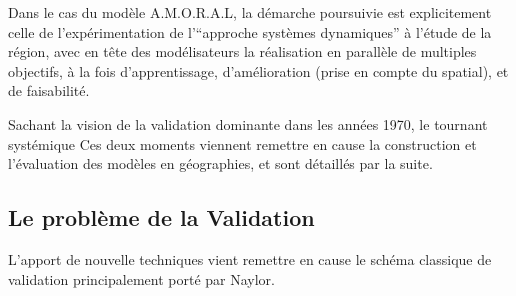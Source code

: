 Dans le cas du modèle A.M.O.R.A.L, la démarche poursuivie est explicitement celle de l'expérimentation de l'\enquote{approche systèmes dynamiques} à l'étude de la région, avec en tête des modélisateurs la réalisation en parallèle de multiples objectifs, à la fois d'apprentissage, d'amélioration (prise en compte du spatial), et de faisabilité. 






Sachant la vision de la validation dominante dans les années 1970, le tournant systémique  Ces deux moments viennent remettre en cause la construction et l'évaluation des modèles en géographies, et sont détaillés par la suite.


\subsection{Le problème de la Validation}
\label{sec:validation}




L'apport de nouvelle techniques vient remettre en cause le schéma classique de validation principalement porté par Naylor.

